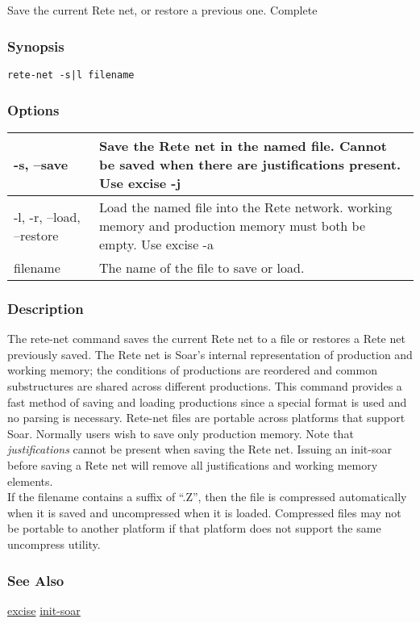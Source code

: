 \subsection{}
\label{rete-net}
Save the current Rete net, or restore a previous one. 
 Complete
\subsubsection*{Synopsis}
\begin{verbatim}
rete-net -s|l filename
\end{verbatim}
\subsubsection*{Options}
\begin{tabular}{|l|l|}
\hline 
 -s, --save  & Save the Rete net in the named file. Cannot be saved when there are justifications present. Use excise -j \\
 \hline 
 -l, -r, --load, --restore  & Load the named file into the Rete network. working memory and production memory must both be empty. Use excise -a \\
 \hline 
filename & The name of the file to save or load.  \\
 \hline 
\end{tabular}
\subsubsection*{Description}
 The rete-net command saves the current Rete net to a file or restores a Rete net previously saved. The Rete net is Soar's internal representation of production and working memory; the conditions of productions are reordered and common substructures are shared across different productions. This command provides a fast method of saving and loading productions since a special format is used and no parsing is necessary. Rete-net files are portable across platforms that support Soar. 
 Normally users wish to save only production memory. Note that \emph{justifications}
 cannot be present when saving the Rete net. Issuing an init-soar before saving a Rete net will remove all justifications and working memory elements. \\ 
 If the filename contains a suffix of ``.Z'', then the file is compressed automatically when it is saved and uncompressed when it is loaded. Compressed files may not be portable to another platform if that platform does not support the same uncompress utility. 
\subsubsection*{See Also}
\hyperref[excise]{excise} \hyperref[init-soar]{init-soar} 